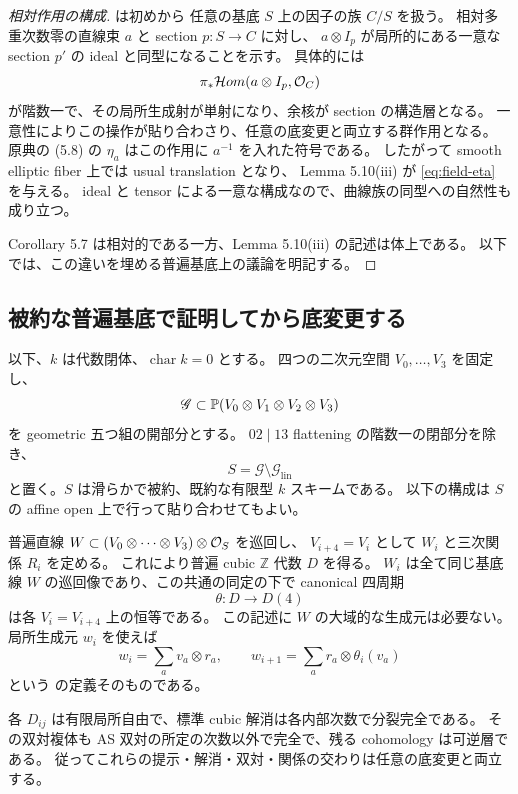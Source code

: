 \begin{proof}[相対作用の構成]
\cite[p.~355, Proposition 5.5 and Corollary 5.7]{ArtinTateVanDenBergh1991} は初めから
任意の基底 $S$ 上の因子の族 $C/S$ を扱う。
相対多重次数零の直線束 $a$ と section $p:S\to C$ に対し、
$a\otimes I_p$ が局所的にある一意な section $p'$ の ideal と同型になることを示す。
具体的には
\[
 \pi_*\mathcal Hom(a\otimes I_p,\mathcal O_C)
\]
が階数一で、その局所生成射が単射になり、余核が section の構造層となる。
一意性によりこの操作が貼り合わさり、任意の底変更と両立する群作用となる。
原典の (5.8) の $\eta_a$ はこの作用に $a^{-1}$ を入れた符号である。
したがって smooth elliptic fiber 上では usual translation となり、
Lemma 5.10(iii) が \eqref{eq:field-eta} を与える。
ideal と tensor による一意な構成なので、曲線族の同型への自然性も成り立つ。

Corollary 5.7 は相対的である一方、Lemma 5.10(iii) の記述は体上である。
以下では、この違いを埋める普遍基底上の議論を明記する。
\end{proof}

\subsection{被約な普遍基底で証明してから底変更する}

以下、$k$ は代数閉体、$\operatorname{char}k=0$ とする。
四つの二次元空間 $V_0,\ldots,V_3$ を固定し、
\[
 \mathscr G\subset\mathbb P(V_0\otimes V_1\otimes V_2\otimes V_3)
\]
を geometric 五つ組の開部分とする。
$02\mid13$ flattening の階数一の閉部分を除き、
\[
 S=\mathscr G\setminus\mathscr G_{\mathrm{lin}}
\]
と置く。$S$ は滑らかで被約、既約な有限型 $k$ スキームである。
以下の構成は $S$ の affine open 上で行って貼り合わせてもよい。

普遍直線 $W\subset(V_0\otimes\cdots\otimes V_3)\otimes\mathcal O_S$ を巡回し、
$V_{i+4}=V_i$ として $W_i$ と三次関係 $R_i$ を定める。
これにより普遍 cubic $\mathbb Z$ 代数 $D$ を得る。
$W_i$ は全て同じ基底線 $W$ の巡回像であり、この共通の同定の下で
canonical 四周期
\[
 \theta:D\longrightarrow D(4)
 \tag{PR-2}\label{eq:theta}
\]
は各 $V_i=V_{i+4}$ 上の恒等である。
この記述に $W$ の大域的な生成元は必要ない。
局所生成元 $w_i$ を使えば
\[
 w_i=\sum_a v_a\otimes r_a,
 \qquad w_{i+1}=\sum_a r_a\otimes\theta_i(v_a)
\]
という \cite[\S5.2]{VdB2011} の定義そのものである。

\begin{lemma}[普遍族の次数別平坦性]\label{lem:universal-flatness}
各 $D_{ij}$ は有限局所自由で、標準 cubic 解消は各内部次数で分裂完全である。
その双対複体も AS 双対の所定の次数以外で完全で、残る cohomology は可逆層である。
従ってこれらの提示・解消・双対・関係の交わりは任意の底変更と両立する。
\end{lemma}

